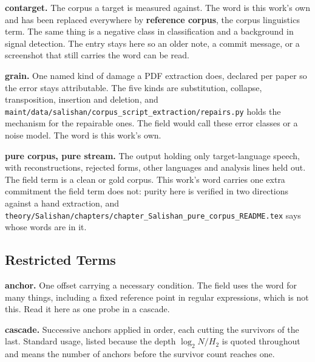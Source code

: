 \noindent\textbf{contarget.} The corpus a target is measured against. The word is this work's own and has been replaced everywhere by \textbf{reference corpus}, the corpus linguistics term. The same thing is a negative class in classification and a background in signal detection. The entry stays here so an older note, a commit message, or a screenshot that still carries the word can be read.

\noindent\textbf{grain.} One named kind of damage a PDF extraction does, declared per paper so the error stays attributable. The five kinds are substitution, collapse, transposition, insertion and deletion, and \texttt{maint/\allowbreak{}data/\allowbreak{}salishan/\allowbreak{}corpus\_\allowbreak{}script\_\allowbreak{}extraction/\allowbreak{}repairs.\allowbreak{}py} holds the mechanism for the repairable ones. The field would call these error classes or a noise model. The word is this work's own.

\noindent\textbf{pure corpus, pure stream.} The output holding only target-language speech, with reconstructions, rejected forms, other languages and analysis lines held out. The field term is a clean or gold corpus. This work's word carries one extra commitment the field term does not: purity here is verified in two directions against a hand extraction, and \texttt{theory/\allowbreak{}Salishan/\allowbreak{}chapters/\allowbreak{}chapter\_\allowbreak{}Salishan\_\allowbreak{}pure\_\allowbreak{}corpus\_\allowbreak{}README.\allowbreak{}tex} says whose words are in it.

\subsection{Restricted Terms}

\noindent\textbf{anchor.} One offset carrying a necessary condition. The field uses the word for many things, including a fixed reference point in regular expressions, which is not this. Read it here as one probe in a cascade.

\noindent\textbf{cascade.} Successive anchors applied in order, each cutting the survivors of the last. Standard usage, listed because the depth \(\log_2 N / H_2\) is quoted throughout and means the number of anchors before the survivor count reaches one.

